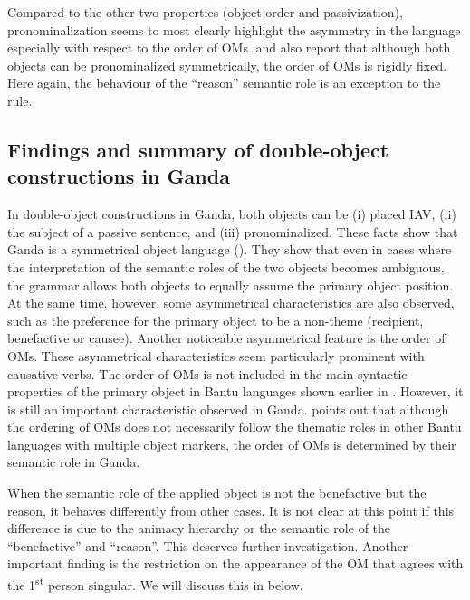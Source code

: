 \documentclass[output=paper,
            colorlinks, citecolor=brown
            ,draftmode
		  ]{langscibook}
\begin{document}
Compared to the other two properties (object order and passivization), pronominalization seems to most clearly highlight the asymmetry in the language especially with respect to the order of OMs. \citet{Ssekiryango2006} and \citet{Ranero2019} also report that although both objects can be pronominalized symmetrically, the order of OMs is rigidly fixed. Here again, the behaviour of the ``reason'' semantic role is an exception to the rule. 



\subsection{Findings and summary of double-object constructions in Ganda} 
\label{sec:yoneda:3.4}


In double-object constructions in Ganda, both objects can be (i) placed IAV, (ii) the subject of a passive sentence, and (iii) pronominalized. These facts show that Ganda is a symmetrical object language (\citealt{BresnanMoshi1993}). They show that even in cases where the interpretation of the semantic roles of the two objects becomes ambiguous, the grammar allows both objects to equally assume the primary object position. At the same time, however, some asymmetrical characteristics are also observed, such as the preference for the primary object to be a non-theme (recipient, benefactive or causee). Another noticeable asymmetrical feature is the order of OMs. These asymmetrical characteristics seem particularly prominent with causative verbs. The order of OMs is not included in the main syntactic properties of the primary object in Bantu languages shown earlier in . However, it is still an important characteristic observed in Ganda. \citet[216--217]{vanderWal2020} points out that although the ordering of OMs does not necessarily follow the thematic roles in other Bantu languages with multiple object markers, the order of OMs is determined by their semantic role in Ganda.    



    When the semantic role of the applied object is not the benefactive but the reason, it behaves differently from other cases. It is not clear at this point if this difference is due to the animacy hierarchy or the semantic role of the ``benefactive'' and ``reason''. This deserves further investigation.     Another important finding is the restriction on the appearance of the OM that agrees with the 1\textsuperscript{st} person singular. We will discuss this in  below.
\end{document}
